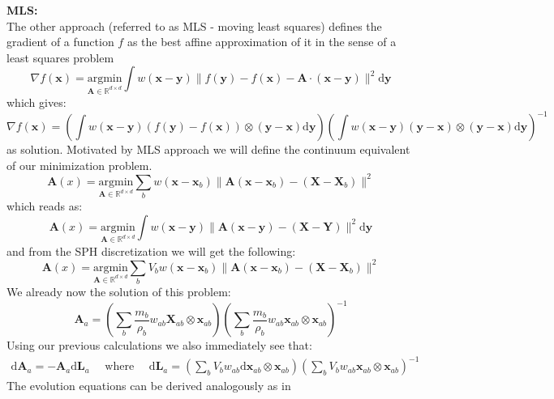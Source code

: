 \documentclass[oneside, a4paper, onecolumn, 11pt]{article}
\renewcommand{\AA}{\mathbf{A}}
\newcommand{\xx}{\mathbf{x}}
\newcommand{\XX}{\mathbf{X}}
\newcommand{\yy}{\mathbf{y}}
\newcommand{\diff}{\mathrm{d}}
\newcommand{\LL}{\mathbf{L}}
\newcommand{\dxx}{\text{d}\mathbf{x}}
\begin{document}
\begin{section}
\begin{subsection}
\begin{subsubsection}
    \textbf{MLS:}\\
    The other approach (referred to as MLS - moving least squares)
    defines the gradient of a function $f$
    as the best affine approximation of it in the sense
    of a least squares problem
    \begin{equation} \label{MLS}
        \nabla f(\xx) =
        \underset{\AA \in \mathbb{R}^{d\times d}}{\text{argmin}}
    \int w(\xx - \yy) \| f(\yy) - f(\xx) - \AA \cdot
    (\xx - \yy) \|^2 \diff \yy
    \end{equation}
    which gives: 
    \begin{equation} \label{MLS_solution}
        \nabla f(\xx) = \left( \int w(\xx - \yy)
        (f(\yy) - f(\xx)) \otimes (\yy - \xx) \diff \yy \right) 
        \left( \int w(\xx - \yy) (\yy - \xx) \otimes
        (\yy - \xx) \diff \yy \right)^{-1}
    \end{equation}
    as solution. 
    Motivated by MLS approach we will define 
    the continuum equivalent of our minimization problem.
    \[
        \AA(x) = 
        \underset{\AA \in \mathbb{R}^{d\times d}}{\text{argmin}}
        \sum_b w(\xx - \xx_b) \| \AA(\xx - \xx_b) - (\XX - \XX_b)\|^2
    \]
    which reads as:
    \begin{equation}\label{cont_ls_problem}
        \AA(x) = 
        \underset{\AA \in \mathbb{R}^{d\times d}}{\text{argmin}}
        \int w(\xx - \yy) \| \AA(\xx - \yy) -
        (\XX - \mathbf{Y})\|^2 \diff \yy
    \end{equation}
    and from the SPH discretization we will get the following:
    \[
        \AA(x) = 
        \underset{\AA \in \mathbb{R}^{d\times d}}{\text{argmin}}
        \sum_b V_{b} w(\xx - \xx_b) 
        \| \AA(\xx - \xx_b) - (\XX - \XX_b)\|^2
    \]
    We already now the solution of this problem:
    \[
        \AA_{a} =
        \left( \sum_b \frac{m_b}{\rho_{b}} w_{ab}
        \XX_{ab} \otimes \xx_{ab} \right) 
        \left( \sum_{b} \frac{m_b}{\rho_b} w_{ab}
        \xx_{ab} \otimes \xx_{ab} \right)^{-1}
    \]
    Using our previous calculations we also immediately see that: 
    \[
        \begin{aligned}
        \diff \AA_{a} = - \AA_{a} \diff \LL_{a}
        \quad \text{ where } \quad
        \diff \LL_{a} = \left( \sum_{b} V_{b} w_{ab} \dxx_{ab} \otimes
        \xx_{ab} \right) 
        \left( \sum_{b} V_{b} w_{ab} \xx_{ab} \otimes 
        \xx_{ab} \right)^{-1}
        \end{aligned}
    \]
    The evolution equations can be derived analogously as in

\end{subsubsection}
\end{subsection}
\end{section}
\end{document}
